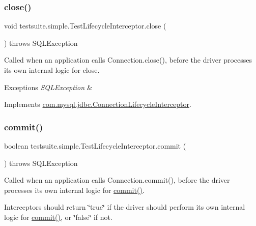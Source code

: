 \subsubsection{\texorpdfstring{close()}{close()}}
{\footnotesize\ttfamily void testsuite.\+simple.\+Test\+Lifecycle\+Interceptor.\+close (\begin{DoxyParamCaption}{ }\end{DoxyParamCaption}) throws S\+Q\+L\+Exception}

Called when an application calls Connection.\+close(), before the driver processes its own internal logic for close.


\begin{DoxyExceptions}{Exceptions}
{\em S\+Q\+L\+Exception} & \\
\hline
\end{DoxyExceptions}


Implements \mbox{\hyperlink{interfacecom_1_1mysql_1_1jdbc_1_1_connection_lifecycle_interceptor_a73675852c009a064292c1ae98d7caeb7}{com.\+mysql.\+jdbc.\+Connection\+Lifecycle\+Interceptor}}.

\mbox{\label{classtestsuite_1_1simple_1_1_test_lifecycle_interceptor_a1c51358948a855403a8953f3d4ba5590}} 
\subsubsection{\texorpdfstring{commit()}{commit()}}
{\footnotesize\ttfamily boolean testsuite.\+simple.\+Test\+Lifecycle\+Interceptor.\+commit (\begin{DoxyParamCaption}{ }\end{DoxyParamCaption}) throws S\+Q\+L\+Exception}

Called when an application calls Connection.\+commit(), before the driver processes its own internal logic for \mbox{\hyperlink{classtestsuite_1_1simple_1_1_test_lifecycle_interceptor_a1c51358948a855403a8953f3d4ba5590}{commit()}}.

Interceptors should return \char`\"{}true\char`\"{} if the driver should perform its own internal logic for \mbox{\hyperlink{classtestsuite_1_1simple_1_1_test_lifecycle_interceptor_a1c51358948a855403a8953f3d4ba5590}{commit()}}, or \char`\"{}false\char`\"{} if not.

